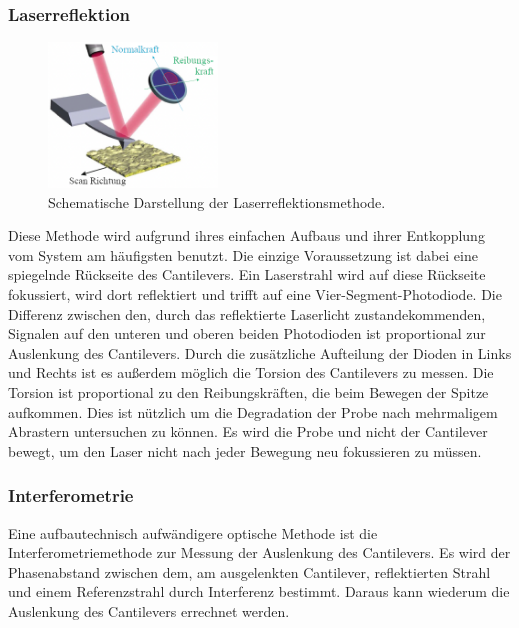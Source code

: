     \subsubsection*{Laserreflektion}
        \begin{figure}
            \vspace{-0.6cm}
            \centering{}
            \includegraphics[width=0.4\textwidth]{bilder/Viersegmentphotodiode.png}
            \caption{Schematische Darstellung der Laserreflektionsmethode. \cite{voigtlaender}} \vspace*{-0.3cm}
            \label{fig:Viersegmentphotodiode}
        \end{figure}
        \FloatBarrier
        Diese Methode wird aufgrund ihres einfachen Aufbaus und ihrer Entkopplung vom System am häufigsten benutzt.
        Die einzige Voraussetzung ist dabei eine spiegelnde Rückseite des Cantilevers.
        Ein Laserstrahl wird auf diese Rückseite fokussiert, wird dort reflektiert und trifft auf eine Vier-Segment-Photodiode.
        Die Differenz zwischen den, durch das reflektierte Laserlicht zustandekommenden, Signalen auf den unteren und oberen beiden Photodioden ist proportional zur Auslenkung des Cantilevers.
        Durch die zusätzliche Aufteilung der Dioden in Links und Rechts ist es außerdem möglich die Torsion des Cantilevers zu messen.
        Die Torsion ist proportional zu den Reibungskräften, die beim Bewegen der Spitze aufkommen.
        Dies ist nützlich um die Degradation der Probe nach mehrmaligem Abrastern untersuchen zu können.
        Es wird die Probe und nicht der Cantilever bewegt, um den Laser nicht nach jeder Bewegung neu fokussieren zu müssen.

    \subsubsection*{Interferometrie}
        Eine aufbautechnisch aufwändigere optische Methode ist die Interferometriemethode zur Messung der Auslenkung des Cantilevers.
        Es wird der Phasenabstand zwischen dem, am ausgelenkten Cantilever, reflektierten Strahl und einem Referenzstrahl durch Interferenz bestimmt.
        Daraus kann wiederum die Auslenkung des Cantilevers errechnet werden.

